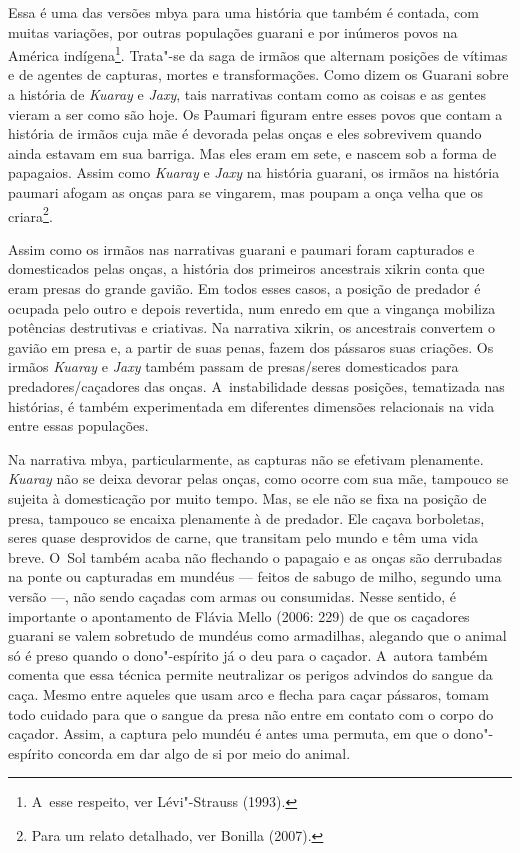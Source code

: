 Essa é uma das versões mbya para uma história que também é contada, com
muitas variações, por outras populações guarani e por inúmeros povos na
América indígena\footnote{A~esse respeito, ver Lévi"-Strauss (1993).}.
Trata"-se da saga de irmãos que alternam posições de vítimas e de
agentes de capturas, mortes e transformações. Como dizem os Guarani
sobre a história de \emph{Kuaray} e \emph{Jaxy}, tais narrativas contam como as
coisas e as gentes vieram a ser como são hoje. Os Paumari figuram entre
esses povos que contam a história de irmãos cuja mãe é devorada pelas
onças e eles sobrevivem quando ainda estavam em sua barriga. Mas eles
eram em sete, e nascem sob a forma de papagaios. Assim como \emph{Kuaray} e
\emph{Jaxy} na história guarani, os irmãos na história paumari afogam as onças
para se vingarem, mas poupam a onça velha que os criara\footnote{Para
um relato detalhado, ver Bonilla (2007).}.

Assim como os irmãos nas narrativas guarani e paumari foram capturados e
domesticados pelas onças, a história dos primeiros ancestrais xikrin
conta que eram presas do grande gavião. Em todos esses casos, a posição
de predador é ocupada pelo outro e depois revertida, num enredo em que
a vingança mobiliza potências destrutivas e criativas. Na narrativa
xikrin, os ancestrais convertem o gavião em presa e, a partir de suas
penas, fazem dos pássaros suas criações. Os irmãos \emph{Kuaray} e \emph{Jaxy} também
passam de presas/seres domesticados para predadores/caçadores das
onças. A~instabilidade dessas posições, tematizada nas histórias, é
também experimentada em diferentes dimensões relacionais na vida entre
essas populações. 

Na narrativa mbya, particularmente, as capturas não se efetivam
plenamente. \emph{Kuaray} não se deixa devorar pelas onças, como ocorre com
sua mãe, tampouco se sujeita à domesticação por muito tempo. Mas, se
ele não se fixa na posição de presa, tampouco se encaixa plenamente à
de predador. Ele caçava borboletas, seres quase desprovidos de carne,
que transitam pelo mundo e têm uma vida breve. O~Sol também acaba não
flechando o papagaio e as onças são derrubadas na ponte ou capturadas
em mundéus --- feitos de sabugo de milho, segundo uma versão ---, não sendo
caçadas com armas ou consumidas. Nesse sentido, é importante o
apontamento de Flávia Mello (2006: 229) de que os caçadores guarani se
valem sobretudo de mundéus como armadilhas, alegando que o animal só é
preso quando o dono"-espírito já o deu para o caçador. A~autora também
comenta que essa técnica permite neutralizar os perigos advindos do
sangue da caça. Mesmo entre aqueles que usam arco e flecha para caçar
pássaros, tomam todo cuidado para que o sangue da presa não entre em
contato com o corpo do caçador. Assim, a captura pelo mundéu é antes
uma permuta, em que o dono"-espírito concorda em dar algo de si por meio
do animal.

